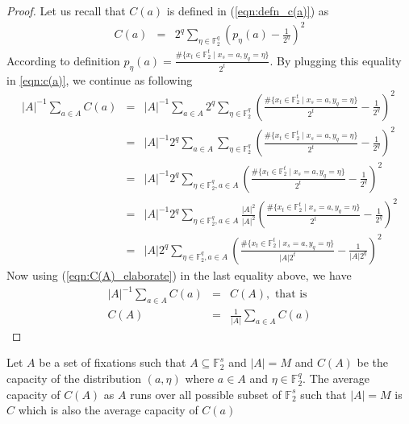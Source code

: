\begin{proof}
Let us recall that $C(a)$ is defined in (\ref{eqn:defn_c(a)}) as
\begin{eqnarray}
C(a) &=& 2^q \displaystyle\sum_{\eta \in \mathbb{F}_{2}^{q}}\left(p_{\eta}\left(a\right) -\frac{1}{2^q}\right)^2 \label{eqn:c(a)}
\end{eqnarray}
According to definition $p_{\eta}\left(a\right) = \frac{\#\lbrace x_t \in \mathbb{F}_{2}^{t}\;|\;x_s = a,y_q=\eta \rbrace}{2^t}$. By plugging this equality in \ref{eqn:c(a)}, we continue as following
\begin{eqnarray*}
|A|^{-1}\displaystyle\sum_{a \in A}C(a) &=& |A|^{-1}\displaystyle\sum_{a \in A}2^q \displaystyle\sum_{\eta \in \mathbb{F}_{2}^{q}}\left(\frac{\#\lbrace x_t \in \mathbb{F}_{2}^{t}\;|\;x_s = a,y_q=\eta \rbrace}{2^t} -\frac{1}{2^q}\right)^2\\
&=& |A|^{-1}2^q\displaystyle\sum_{a \in A} \displaystyle\sum_{\eta \in \mathbb{F}_{2}^{q}}\left(\frac{\#\lbrace x_t \in \mathbb{F}_{2}^{t}\;|\;x_s = a,y_q=\eta \rbrace}{2^t} -\frac{1}{2^q}\right)^2\\
&=& |A|^{-1}2^q\displaystyle\sum_{\eta \in \mathbb{F}_{2}^{q}, a \in A}\left(\frac{\#\lbrace x_t \in \mathbb{F}_{2}^{t}\;|\;x_s = a,y_q=\eta \rbrace}{2^t} -\frac{1}{2^q}\right)^2\\
&=& |A|^{-1}2^q\displaystyle\sum_{\eta \in \mathbb{F}_{2}^{q}, a \in A}\frac{|A|^2}{|A|^2}\left(\frac{\#\lbrace x_t \in \mathbb{F}_{2}^{t}\;|\;x_s = a,y_q=\eta \rbrace}{2^t} -\frac{1}{2^q}\right)^2\\
&=& |A|2^q\displaystyle\sum_{\eta \in \mathbb{F}_{2}^{q}, a \in A}\left(\frac{\#\lbrace x_t \in \mathbb{F}_{2}^{t}\;|\;x_s = a,y_q=\eta \rbrace}{|A|2^t} -\frac{1}{|A|2^q}\right)^2
\end{eqnarray*}
Now using (\ref{eqn:C(A)_elaborate}) in the last equality above, we have
\begin{eqnarray*}
|A|^{-1}\displaystyle\sum_{a \in A}C(a) &=& C(A), \mbox{ that is } \\
C(A) &=& \frac{1}{|A|}\displaystyle\sum_{a \in A}C(a)
\end{eqnarray*}
\end{proof}
\begin{lemma} \label{lemma:C(A)_2} Let $A$ be a set of fixations such that $A \subseteq \mathbb{F}_{2}^{s}$ and $|A|=M$ and $C(A)$ be the capacity of the distribution $(a,\eta)$ where $a \in A$ and $\eta \in \mathbb{F}_{2}^{q}$. The average capacity of $C(A)$ as $A$ runs over all possible subset of $\mathbb{F}_{2}^{s}$ such that $|A| = M$ is
$C$ which is also the average capacity of $C(a)$
\end{lemma}
